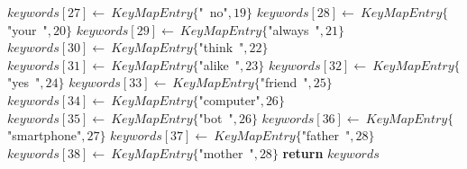 \documentclass[a4paper,10pt]{article}
\begin{document}
\begin{algorithm}
\begin{algorithmic}[5]
  \State \(keywords[27]\gets\ KeyMapEntry\{\)"{}\ no"{}\(,19\}\)
  \State \(keywords[28]\gets\ KeyMapEntry\{\)"{}your\ "{}\(,20\}\)
  \State \(keywords[29]\gets\ KeyMapEntry\{\)"{}always\ "{}\(,21\}\)
  \State \(keywords[30]\gets\ KeyMapEntry\{\)"{}think\ "{}\(,22\}\)
  \State \(keywords[31]\gets\ KeyMapEntry\{\)"{}alike\ "{}\(,23\}\)
  \State \(keywords[32]\gets\ KeyMapEntry\{\)"{}yes\ "{}\(,24\}\)
  \State \(keywords[33]\gets\ KeyMapEntry\{\)"{}friend\ "{}\(,25\}\)
  \State \(keywords[34]\gets\ KeyMapEntry\{\)"{}computer"{}\(,26\}\)
  \State \(keywords[35]\gets\ KeyMapEntry\{\)"{}bot\ "{}\(,26\}\)
  \State \(keywords[36]\gets\ KeyMapEntry\{\)"{}smartphone"{}\(,27\}\)
  \State \(keywords[37]\gets\ KeyMapEntry\{\)"{}father\ "{}\(,28\}\)
  \State \(keywords[38]\gets\ KeyMapEntry\{\)"{}mother\ "{}\(,28\}\)
  \State \textbf{return} \(keywords\)
\EndFunction
\end{algorithmic}
\end{algorithm}
\end{document}
